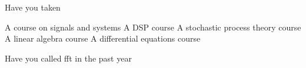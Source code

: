 Have you taken

A course on signals and systems
A DSP course
A stochastic process theory course
A linear algebra course
A differential equations course

Have you called fft in the past year


